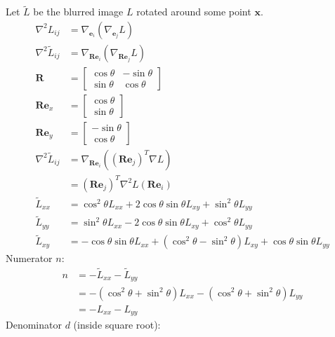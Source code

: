 \documentclass[thesis.tex]{subfiles}
\begin{document}


Let $\widetilde{L}$ be the blurred image $L$ rotated around some point $\mathbf{x}$. 
\begin{align}
\nabla^2 L_{ij} &= \nabla_{\mathbf{e}_i} (\nabla_{\mathbf{e}_j} L) \\
\nabla^2 \widetilde{L}_{ij} &= \nabla_{\mathbf{Re}_i} (\nabla_{\mathbf{Re}_j} L) \\
\mathbf{R} &= \begin{bmatrix}
\cos \theta & -\sin \theta \\
\sin \theta & \cos \theta
\end{bmatrix} \\
\mathbf{Re}_x &= \begin{bmatrix}
\cos \theta \\ \sin \theta
\end{bmatrix} \\
\mathbf{Re}_y &= \begin{bmatrix}
-\sin \theta \\ \cos \theta
\end{bmatrix} \\
\nabla^2 \widetilde{L}_{ij}
&= \nabla_{\mathbf{Re}_i} \left( (\mathbf{Re}_j)^T \nabla L \right) \\
&= (\mathbf{Re}_j)^T \nabla^2 L (\mathbf{Re}_i) \\
\widetilde{L}_{xx} &= \cos^2 \theta L_{xx} + 2 \cos \theta \sin \theta L_{xy} + \sin^2 \theta L_{yy} \\
\widetilde{L}_{yy} &= \sin^2 \theta L_{xx} - 2 \cos \theta \sin \theta L_{xy} + \cos^2 \theta L_{yy} \\
\widetilde{L}_{xy} &= -\cos \theta \sin \theta L_{xx} + (\cos^2 \theta - \sin^2 \theta) L_{xy} + \cos \theta \sin \theta L_{yy}
\end{align}
%
Numerator $n$:
%
\begin{align}
n &= - \widetilde{L}_{xx} - \widetilde{L}_{yy} \\
&= -(\cos^2 \theta + \sin^2 \theta)  L_{xx} - (\cos^2 \theta + \sin^2 \theta) L_{yy} \\
&= -L_{xx} - L_{yy}
\end{align}
%
Denominator $d$ (inside square root):
%
\end{document}
